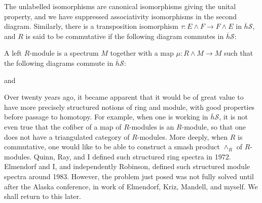 The unlabelled isomorphisms are canonical isomorphisms giving the unital property, and we have suppressed associativity isomorphisms in the second diagram. Similarly, there is a transposition isomorphism $\tau: E \wedge F \longrightarrow F \wedge E$ in $\overline{h}\mathscr{S}$, and $R$ is said to be commutative if the following diagram commutes in $\overline{h}\mathscr{S}$:

\begin{center}
\end{center}

A left $R$-module is a spectrum $M$ together with a map $\mu: R \wedge M \longrightarrow M$ such that the following diagrams commute in $\overline{h}\mathscr{S}$:

\begin{center}
\end{center}

and

\begin{center}
\end{center}

Over twenty years ago, it became apparent that it would be of great value to have more precisely structured notions of ring and module, with good properties before passage to homotopy. For example, when one is working in $\overline{h}\mathscr{S}$, it is not even true that the cofiber of a map of $R$-modules is an $R$-module, so that one does not have a triangulated category of $R$-modules. More deeply, when $R$ is commutative, one would like to be able to construct a smash product $\wedge_R$ of $R$-modules. Quinn, Ray, and I defined such structured ring spectra in 1972. Elmendorf and I, and independently Robinson, defined such structured module spectra around 1983. However, the problem just posed was not fully solved until after the Alaska conference, in work of Elmendorf, Kriz, Mandell, and myself. We shall return to this later.

